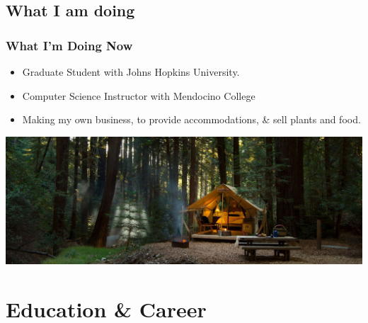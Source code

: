 \documentclass{beamer}
\begin{document}
			
		\subsection{What I am doing}
			\begin{frame}
				\frametitle{What I'm Doing Now}
				\begin{itemize}
					\item Graduate Student with Johns Hopkins University.
					\item Computer Science Instructor with Mendocino College
					\item Making my own business, to provide accommodations, \& sell plants and food.     
				\end{itemize}
				\begin{center}
					\includegraphics[width = 1.0\textwidth]{images/glamping.png}
				\end{center}
			\end{frame}



	\section{Education \& Career}
	
\end{document}
